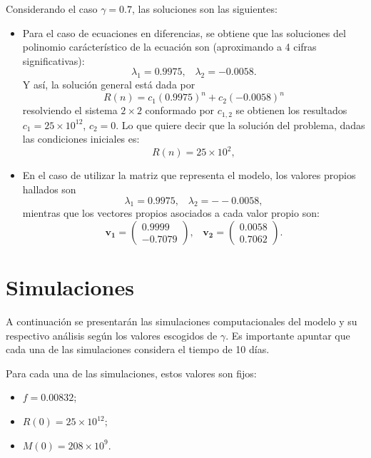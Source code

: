 Considerando el caso $\gamma = 0.7$, las soluciones son las siguientes:
\begin{itemize}
    \item Para el caso de ecuaciones en diferencias, se obtiene que las soluciones del polinomio carácterístico de la ecuación son (aproximando a 4 cifras significativas):
        $$\lambda_1 = 0.9975,\;\;\; \lambda_2 = -0.0058.$$
        Y así, la solución general está dada por 
        $$R(n)=c_1(0.9975)^n+c_2(-0.0058)^n$$
        resolviendo el sistema $2\times 2$ conformado por $c_{1,2}$ se obtienen los resultados $c_1=25\times 10^{12}$, $c_2 = 0$. Lo que quiere decir que la solución del problema, dadas las condiciones iniciales es:
        $$R(n)=25\times 10^{2},$$
    \item En el caso de utilizar la matriz que representa el modelo, los valores propios hallados son
        $$\lambda_1 = 0.9975, \;\;\; \lambda_2 = --0.0058,$$
        mientras que los vectores propios asociados a cada valor propio son:
        $$\mathbf{v_1}=\begin{pmatrix}
            0.9999  \\ 
            -0.7079
            \end{pmatrix},\;\;\;  \mathbf{v_2}=\begin{pmatrix}
            0.0058  \\
            0.7062
            \end{pmatrix}.$$

\end{itemize}

\section{Simulaciones}\label{sec:modelo:simulaciones}
A continuación se presentarán las simulaciones computacionales del modelo y su respectivo análisis según los valores escogidos de $\gamma$. Es importante apuntar que cada una de las simulaciones considera el tiempo de 10 días.

Para cada una de las simulaciones, estos valores son fijos:
\begin{itemize}
    \item $f=0.00832$;
    \item $R(0) = 25\times 10^{12};$
    \item $M(0) = 208 \times 10^{9}.$
\end{itemize}


